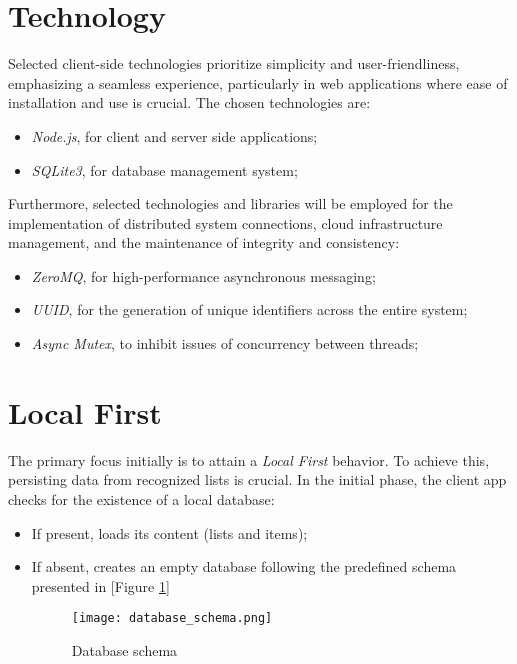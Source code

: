 \documentclass[sigconf, authorversion, nonacm]{acmart}
\begin{document}
\maketitle

\pagestyle{plain}

\section{Technology}

Selected client-side technologies prioritize simplicity and user-friendliness, emphasizing a seamless experience, particularly in web applications where ease of installation and use is crucial. The chosen technologies are:
\begin{itemize}
\item \textit{Node.js}, for client and server side applications;
\item \textit{SQLite3}, for database management system;
\end{itemize}

Furthermore, selected technologies and libraries will be employed for the implementation of distributed system connections, cloud infrastructure management, and the maintenance of integrity and consistency:

\begin{itemize}
    \item \textit{ZeroMQ}, for high-performance asynchronous messaging;
    \item \textit{UUID}, for the generation of unique identifiers across the entire system;
    \item \textit{Async Mutex}, to inhibit issues of concurrency between threads;
\end{itemize}

\section{Local First}

The primary focus initially is to attain a \textit{Local First} \cite{localfirst} behavior. To achieve this, persisting data from recognized lists is crucial. In the initial phase, the client app checks for the existence of a local database:

\begin{itemize}
    \item If present, loads its content (lists and items);
    \item If absent, creates an empty database following the predefined schema presented in [Figure \ref{fig:Database schema}]

    \begin{figure}[H]
        \centering
        \texttt{[image: database\_schema.png]}
        \caption{Database schema}
        \label{fig:Database schema}
    \end{figure}

\end{itemize}
\end{document}
